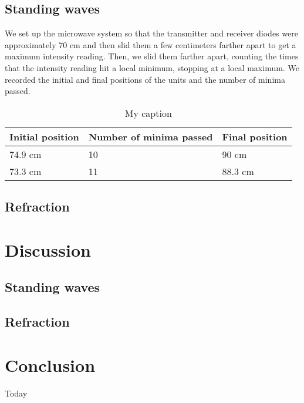 \documentclass[11pt, titlepage, letterpaper, twoside]{article}
\begin{document}
\subsection{Standing waves}

We set up the microwave system so that the transmitter and receiver diodes were approximately 70 cm and then slid them
a few centimeters farther apart to get a maximum intensity reading. Then, we slid them farther apart, counting the
times that the intensity reading hit a local minimum, stopping at a local maximum. We recorded the initial and final
positions of the units and the number of minima passed.

\begin{table}[h!]
\centering
\caption{My caption}
\label{my-label}
\begin{tabular}{|l|l|l|}
\hline
Initial position & Number of minima passed & Final position \\ \hline
74.9 cm          & 10                      & 90 cm          \\ \hline
73.3 cm          & 11                      & 88.3 cm        \\ \hline
\end{tabular}
\end{table}

\subsection{Refraction}


\section{Discussion}

\subsection{Standing waves}


\subsection{Refraction}




\section{Conclusion}
Today
\end{document}
